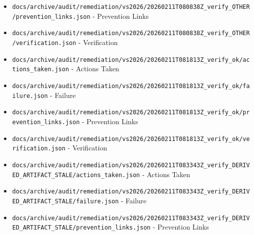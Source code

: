 \documentclass[10.5pt,a4paper,openany]{book}
\begin{document}
\begin{itemize}
\item \texttt{docs/\allowbreak{}archive/\allowbreak{}audit/\allowbreak{}remediation/\allowbreak{}vs2026/\allowbreak{}20260211T080838Z\_\allowbreak{}verify\_\allowbreak{}OTHER/\allowbreak{}prevention\_\allowbreak{}links.\allowbreak{}json} -\allowbreak{} Prevention Links
\item \texttt{docs/\allowbreak{}archive/\allowbreak{}audit/\allowbreak{}remediation/\allowbreak{}vs2026/\allowbreak{}20260211T080838Z\_\allowbreak{}verify\_\allowbreak{}OTHER/\allowbreak{}verification.\allowbreak{}json} -\allowbreak{} Verification
\item \texttt{docs/\allowbreak{}archive/\allowbreak{}audit/\allowbreak{}remediation/\allowbreak{}vs2026/\allowbreak{}20260211T081813Z\_\allowbreak{}verify\_\allowbreak{}ok/\allowbreak{}actions\_\allowbreak{}taken.\allowbreak{}json} -\allowbreak{} Actions Taken
\item \texttt{docs/\allowbreak{}archive/\allowbreak{}audit/\allowbreak{}remediation/\allowbreak{}vs2026/\allowbreak{}20260211T081813Z\_\allowbreak{}verify\_\allowbreak{}ok/\allowbreak{}failure.\allowbreak{}json} -\allowbreak{} Failure
\item \texttt{docs/\allowbreak{}archive/\allowbreak{}audit/\allowbreak{}remediation/\allowbreak{}vs2026/\allowbreak{}20260211T081813Z\_\allowbreak{}verify\_\allowbreak{}ok/\allowbreak{}prevention\_\allowbreak{}links.\allowbreak{}json} -\allowbreak{} Prevention Links
\item \texttt{docs/\allowbreak{}archive/\allowbreak{}audit/\allowbreak{}remediation/\allowbreak{}vs2026/\allowbreak{}20260211T081813Z\_\allowbreak{}verify\_\allowbreak{}ok/\allowbreak{}verification.\allowbreak{}json} -\allowbreak{} Verification
\item \texttt{docs/\allowbreak{}archive/\allowbreak{}audit/\allowbreak{}remediation/\allowbreak{}vs2026/\allowbreak{}20260211T083343Z\_\allowbreak{}verify\_\allowbreak{}DERIVED\_\allowbreak{}ARTIFACT\_\allowbreak{}STALE/\allowbreak{}actions\_\allowbreak{}taken.\allowbreak{}json} -\allowbreak{} Actions Taken
\item \texttt{docs/\allowbreak{}archive/\allowbreak{}audit/\allowbreak{}remediation/\allowbreak{}vs2026/\allowbreak{}20260211T083343Z\_\allowbreak{}verify\_\allowbreak{}DERIVED\_\allowbreak{}ARTIFACT\_\allowbreak{}STALE/\allowbreak{}failure.\allowbreak{}json} -\allowbreak{} Failure
\item \texttt{docs/\allowbreak{}archive/\allowbreak{}audit/\allowbreak{}remediation/\allowbreak{}vs2026/\allowbreak{}20260211T083343Z\_\allowbreak{}verify\_\allowbreak{}DERIVED\_\allowbreak{}ARTIFACT\_\allowbreak{}STALE/\allowbreak{}prevention\_\allowbreak{}links.\allowbreak{}json} -\allowbreak{} Prevention Links

\end{itemize}
\end{document}
